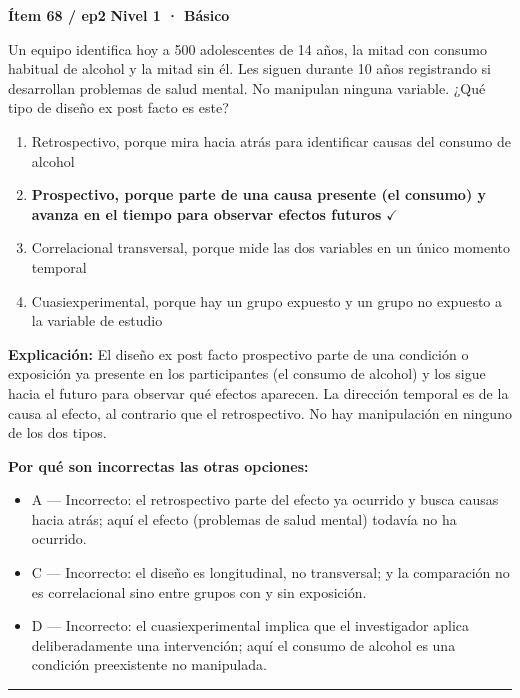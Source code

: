 \documentclass[12pt,a4paper]{article}
\begin{document}
\begin{mdframed}[backgroundcolor=fondogris,linecolor=azul,linewidth=1pt,innerleftmargin=10pt,innerrightmargin=10pt,innertopmargin=7pt,innerbottommargin=7pt]
\textbf{Ítem 68 / ep2} \hfill {\small\bfseries\color{azul} Nivel 1 · Básico}
\end{mdframed}

Un equipo identifica hoy a 500 adolescentes de 14 años, la mitad con consumo habitual de alcohol y la mitad sin él. Les siguen durante 10 años registrando si desarrollan problemas de salud mental. No manipulan ninguna variable. ¿Qué tipo de diseño ex post facto es este?

\begin{enumerate}
  \item[A.] Retrospectivo, porque mira hacia atrás para identificar causas del consumo de alcohol
  \item[\textbf{\color{verde}B.}] \textbf{\color{verde} Prospectivo, porque parte de una causa presente (el consumo) y avanza en el tiempo para observar efectos futuros} \hfill $\checkmark$
  \item[C.] Correlacional transversal, porque mide las dos variables en un único momento temporal
  \item[D.] Cuasiexperimental, porque hay un grupo expuesto y un grupo no expuesto a la variable de estudio
\end{enumerate}

\noindent\textbf{\color{azul}Explicación:} El diseño ex post facto prospectivo parte de una condición o exposición ya presente en los participantes (el consumo de alcohol) y los sigue hacia el futuro para observar qué efectos aparecen. La dirección temporal es de la causa al efecto, al contrario que el retrospectivo. No hay manipulación en ninguno de los dos tipos.

\noindent\textbf{\color{gris}Por qué son incorrectas las otras opciones:}
\begin{itemize}
  \item {\small A — Incorrecto: el retrospectivo parte del efecto ya ocurrido y busca causas hacia atrás; aquí el efecto (problemas de salud mental) todavía no ha ocurrido.}
  \item {\small C — Incorrecto: el diseño es longitudinal, no transversal; y la comparación no es correlacional sino entre grupos con y sin exposición.}
  \item {\small D — Incorrecto: el cuasiexperimental implica que el investigador aplica deliberadamente una intervención; aquí el consumo de alcohol es una condición preexistente no manipulada.}
\end{itemize}
\vspace{8pt}\hrule\vspace{10pt}
\end{document}
